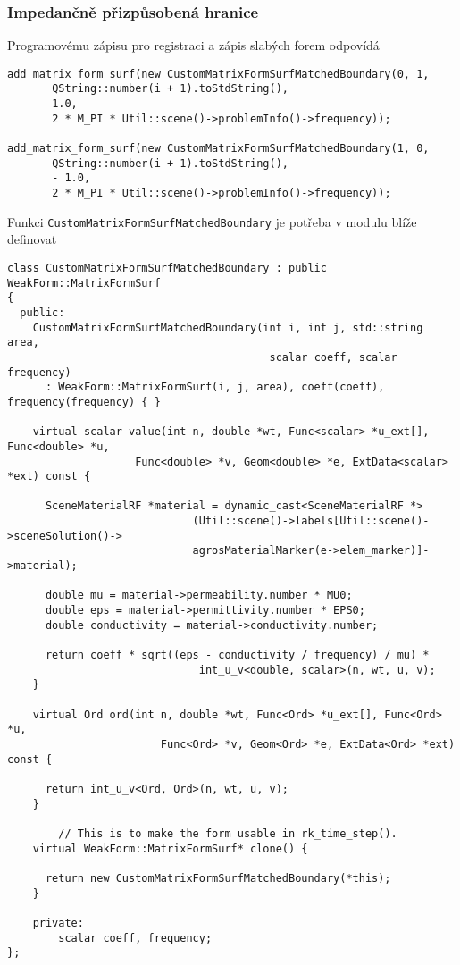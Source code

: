 \subsubsection*{Impedančně přizpůsobená hranice}
Programovému zápisu pro registraci a zápis slabých forem odpovídá
\begin{verbatim}
add_matrix_form_surf(new CustomMatrixFormSurfMatchedBoundary(0, 1,
       QString::number(i + 1).toStdString(),
       1.0,
       2 * M_PI * Util::scene()->problemInfo()->frequency));
       
add_matrix_form_surf(new CustomMatrixFormSurfMatchedBoundary(1, 0,
       QString::number(i + 1).toStdString(),
       - 1.0,
       2 * M_PI * Util::scene()->problemInfo()->frequency));            
\end{verbatim}
Funkci \texttt{CustomMatrixFormSurfMatchedBoundary} je potřeba v modulu blíže definovat
\begin{verbatim}
class CustomMatrixFormSurfMatchedBoundary : public WeakForm::MatrixFormSurf
{
  public:
    CustomMatrixFormSurfMatchedBoundary(int i, int j, std::string area, 
                                         scalar coeff, scalar frequency)
      : WeakForm::MatrixFormSurf(i, j, area), coeff(coeff), frequency(frequency) { }

    virtual scalar value(int n, double *wt, Func<scalar> *u_ext[], Func<double> *u, 
                    Func<double> *v, Geom<double> *e, ExtData<scalar> *ext) const {
      
      SceneMaterialRF *material = dynamic_cast<SceneMaterialRF *>
                             (Util::scene()->labels[Util::scene()->sceneSolution()->
                             agrosMaterialMarker(e->elem_marker)]->material);

      double mu = material->permeability.number * MU0;
      double eps = material->permittivity.number * EPS0;
      double conductivity = material->conductivity.number;

      return coeff * sqrt((eps - conductivity / frequency) / mu) * 
                              int_u_v<double, scalar>(n, wt, u, v);
    }

    virtual Ord ord(int n, double *wt, Func<Ord> *u_ext[], Func<Ord> *u,
                        Func<Ord> *v, Geom<Ord> *e, ExtData<Ord> *ext) const {
    
      return int_u_v<Ord, Ord>(n, wt, u, v);
    }

        // This is to make the form usable in rk_time_step().
    virtual WeakForm::MatrixFormSurf* clone() {

      return new CustomMatrixFormSurfMatchedBoundary(*this);
    }

    private:
        scalar coeff, frequency;
};
\end{verbatim}

